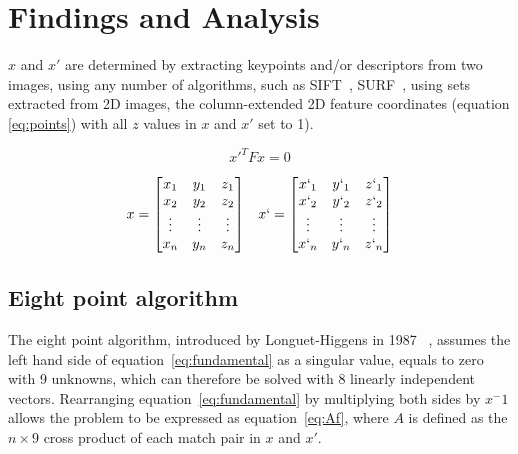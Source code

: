 \documentclass[12pt]{article}
\begin{document}
\section{Findings and Analysis}
$x$ and $x'$ are determined by extracting keypoints and/or descriptors from two images, using any number of algorithms, such as SIFT~\cite{Lowe:2004:DIF:993451.996342}, SURF~\cite{Bay:2008:SRF:1370312.1370556},  using sets extracted from 2D images, the column-extended 2D feature coordinates (equation \eqref{eq:points}) with all $z$ values in $x$ and $x'$ set to 1).

\begin{center}
    \begin{equation}\label{eq:fundamental}
        {x}'^TFx = 0
    \end{equation}
\end{center}


\begin{align}\label{eq:points}
    x = 
    \begin{bmatrix}
        x_1 & y_1 & z_1\\ 
        x_2 & y_2 & z_2\\ 
        \vdots&\vdots&\vdots\\ 
        x_n&y_n&z_n\\
    \end{bmatrix}
    &&
    x` =
    \begin{bmatrix}
        x`_1 & y`_1 & z`_1\\ 
        x`_2 & y`_2 & z`_2\\ 
        \vdots & \vdots & \vdots\\ 
        x`_n&y`_n&z`_n\\
    \end{bmatrix}
\end{align}

\subsection{Eight point algorithm}
The eight point algorithm, introduced by Longuet-Higgens in 1987 ~\cite{Longuet-Higgins:1987:CAR:33517.33523}, assumes the left hand side of equation~\eqref{eq:fundamental} as a singular value, equals to zero with 9 unknowns, which can therefore be solved with 8 linearly independent vectors. Rearranging equation~\eqref{eq:fundamental} by multiplying both sides by ${x}^-1$ allows the problem to be expressed as equation~\eqref{eq:Af}, where $A$ is defined as the $n\times9$ cross product of each match pair in $x$ and $x'$.
\end{document}
